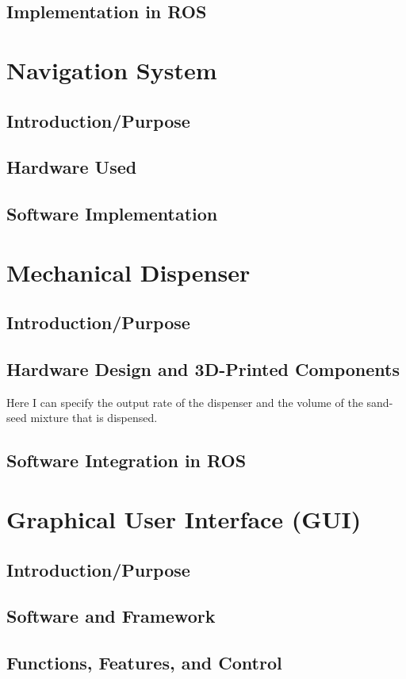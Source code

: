 \subsection{Implementation in ROS}

\section{Navigation System}
\subsection{Introduction/Purpose}
\subsection{Hardware Used}
\subsection{Software Implementation}

\section{Mechanical Dispenser}
\subsection{Introduction/Purpose}
\subsection{Hardware Design and 3D-Printed Components}
Here I can specify the output rate of the dispenser and the volume of the sand-seed mixture that is dispensed.
\subsection{Software Integration in ROS}

\section{Graphical User Interface (GUI)}
\subsection{Introduction/Purpose}
\subsection{Software and Framework}
\subsection{Functions, Features, and Control}


